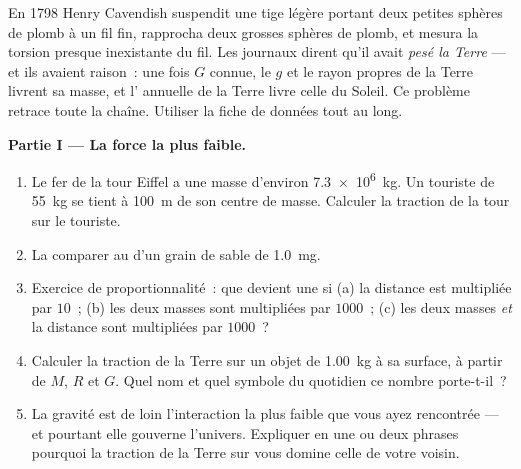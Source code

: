 \begin{problem}
\label{pb:g10:universal-gravitation:1}
En 1798 Henry Cavendish suspendit une tige légère portant deux petites
sphères de plomb à un fil fin, rapprocha deux grosses sphères de plomb,
et mesura la torsion presque inexistante du fil. Les journaux
dirent qu'il avait \emph{pesé la Terre} --- et ils avaient raison~: une
fois $G$ connue, le $g$ et le rayon propres de la Terre livrent sa
masse, et l' annuelle de la Terre livre celle du Soleil.
Ce problème retrace toute la chaîne. Utiliser la fiche de données tout
au long.

\medskip
\noindent\textbf{Partie I --- La force la plus faible.}
\begin{enumerate}
  \item Le fer de la tour Eiffel a une masse d'environ \qty{7.3e6}{kg}.
        Un touriste de \qty{55}{kg} se tient à \qty{100}{m} de son
        centre de masse. Calculer la traction de la tour sur le
        touriste.
  \item La comparer au  d'un grain de sable de
        \qty{1.0}{mg}.
  \item Exercice de proportionnalité~: que devient une
         si (a) la distance est multipliée
        par $10$~; (b) les deux masses sont multipliées par $1000$~;
        (c) les deux masses \emph{et} la distance sont multipliées par
        $1000$~?
  \item Calculer la traction de la Terre sur un objet de \qty{1.00}{kg}
        à sa surface, à partir de $M$, $R$ et $G$. Quel nom et quel
        symbole du quotidien ce nombre porte-t-il~?
  \item La gravité est de loin l'interaction la plus faible que vous
        ayez rencontrée --- et pourtant elle gouverne l'univers.
        Expliquer en une ou deux phrases pourquoi la traction de la
        Terre sur vous domine celle de votre voisin.
\end{enumerate}


\end{problem}
